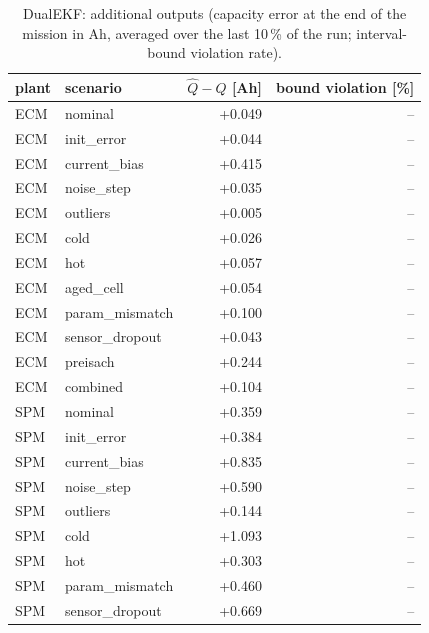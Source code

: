 \begin{table}[H]\centering\small\caption{DualEKF: additional outputs (capacity error at the end of the mission in Ah, averaged over the last 10\,\% of the run; interval-bound violation rate).}\label{tab:cellx_DualEKF}
\begin{tabular}{llrr}\toprule plant & scenario & $\hat Q - Q$ [Ah] & bound violation [\%] \\ \midrule
ECM & nominal & +0.049 & -- \\
ECM & init\_error & +0.044 & -- \\
ECM & current\_bias & +0.415 & -- \\
ECM & noise\_step & +0.035 & -- \\
ECM & outliers & +0.005 & -- \\
ECM & cold & +0.026 & -- \\
ECM & hot & +0.057 & -- \\
ECM & aged\_cell & +0.054 & -- \\
ECM & param\_mismatch & +0.100 & -- \\
ECM & sensor\_dropout & +0.043 & -- \\
ECM & preisach & +0.244 & -- \\
ECM & combined & +0.104 & -- \\
SPM & nominal & +0.359 & -- \\
SPM & init\_error & +0.384 & -- \\
SPM & current\_bias & +0.835 & -- \\
SPM & noise\_step & +0.590 & -- \\
SPM & outliers & +0.144 & -- \\
SPM & cold & +1.093 & -- \\
SPM & hot & +0.303 & -- \\
SPM & param\_mismatch & +0.460 & -- \\
SPM & sensor\_dropout & +0.669 & -- \\
\bottomrule\end{tabular}\end{table}
